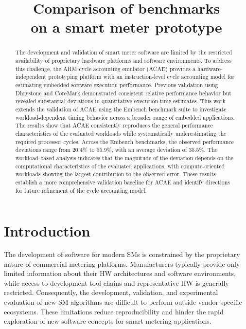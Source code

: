 \documentclass[conference]{IEEEtran}
\title{Comparison of benchmarks\\on a smart meter prototype}
\author{
    \IEEEauthorblockN{Jakob Fregin}
    \IEEEauthorblockA{
        Chair of Privacy and Security \\
        TU Dresden \\
        jakob.fregin@mailbox.tu-dresden.de \\
    }
}
\begin{document}
	\maketitle

	\begin{abstract}
		The development and validation of smart meter software are limited by the restricted availability of proprietary hardware platforms and software environments.
		To address this challenge, the ARM cycle accounting emulator (ACAE) provides a hardware-independent prototyping platform with an instruction-level cycle accounting model for estimating embedded software execution performance.
		Previous validation using Dhrystone and CoreMark demonstrated consistent relative performance behavior but revealed substantial deviations in quantitative execution-time estimates.
		This work extends the validation of ACAE using the Embench benchmark suite to investigate workload-dependent timing behavior across a broader range of embedded applications.
		The results show that ACAE consistently reproduces the general performance characteristics of the evaluated workloads while systematically underestimating the required processor cycles.
		Across the Embench benchmarks, the observed performance deviations range from $20.4\%$ to $55.9\%$, with an average deviation of $35.5\%$.
		The workload-based analysis indicates that the magnitude of the deviation depends on the computational characteristics of the evaluated applications, with compute-oriented workloads showing the largest contribution to the observed error.
		These results establish a more comprehensive validation baseline for ACAE and identify directions for future refinement of the cycle accounting model.
	\end{abstract}

	\section{Introduction}
		\label{sec:intro}

		The development of software for modern \acp{SM} is constrained by the proprietary nature of commercial metering platforms.
		Manufacturers typically provide only limited information about their \ac{HW} architectures and software environments, while access to development tool chains and representative \ac{HW} is generally restricted.
		Consequently, the development, validation, and experimental evaluation of new \ac{SM} algorithms are difficult to perform outside vendor-specific ecosystems.
		These limitations reduce reproducibility and hinder the rapid exploration of new software concepts for smart metering applications.
\end{document}
